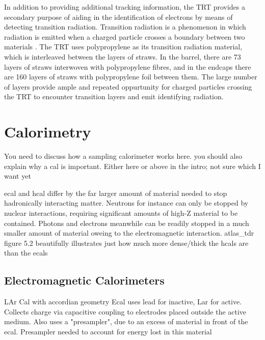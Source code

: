             In addition to providing additional tracking information, the TRT provides a secondary purpose of aiding in the identification of electrons by means of detecting transition radiation. 
            Transition radiation is a phenomenon in which radiation is emitted when a charged particle crosses a boundary between two materials \cite{transition_radiation}.
            The TRT uses polypropylene as its transition radiation material, which is interleaved between the layers of straws.
            In the barrel, there are 73 layers of straws interwoven with polypropylene fibres, and in the endcaps there are 160 layers of straws with polypropylene foil between them.
            The large number of layers provide ample and repeated oppurtunity for charged particles crossing the TRT to encounter transition layers and emit identifying radiation.



\section{Calorimetry} %
    You need to discuss how a sampling calorimeter works here.
    you should also explain why a cal is important. Either here or above in the intro; not sure which I want yet

    ecal and hcal differ by the far larger amount of material needed to stop hadronically interacting matter.
    Neutrons for instance can only be stopped by nuclear interactions, requiring significant amounts of high-Z material to be contained. \cite{energy_measurement}
    Photons and electrons meanwhile can be readily stopped in a much smaller amount of material oweing to the electromagnetic interaction.
    atlas_tdr figure 5.2 beautifully illustrates just how much more dense/thick the hcals are than the ecals



    \subsection{Electromagnetic Calorimeters}
        LAr Cal with accordian geometry
        Ecal uses lead for inactive, Lar for active.
        Collects charge via capacitive coupling to electrodes placed outside the active medium.
        Also uses a "presampler", due to an excess of material in front of the ecal. Presampler needed to account for energy lost in this material


